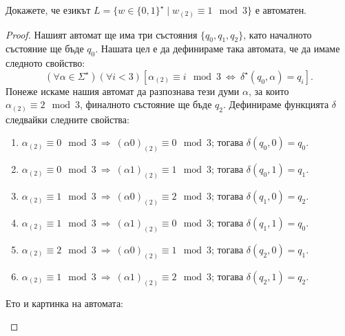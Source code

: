 \begin{prb}
  Докажете, че езикът
  $L = \{w \in \{0,1\}^\star \mid w_{(2)} \equiv 1 \mod 3\}$
  е автоматен.
\end{prb}
\begin{proof}
  Нашият автомат ще има три състояния $\{q_0,q_1,q_2\}$, като началното състояние ще бъде $q_0$.
  Нашата цел е да дефинираме така автомата, че да имаме следното свойство:
  \[(\forall\alpha\in\Sigma^\star)(\forall i < 3)[\alpha_{(2)} \equiv i\mod 3\ \Leftrightarrow\ \delta^\star(q_0,\alpha) = q_i].\]
  Понеже искаме нашия автомат да разпознава тези думи $\alpha$,
  за които $\alpha_{(2)} \equiv 2\mod 3$, финалното състояние ще бъде $q_2$.
  Дефинираме функцията $\delta$ следвайки следните свойства:
  \begin{enumerate}[(1)]
  \item
    $\alpha_{(2)} \equiv 0 \mod 3\ \Rightarrow\ (\alpha0)_{(2)} \equiv 0 \mod 3$; тогава $\delta(q_0,0) = q_0$.
  \item 
    $\alpha_{(2)} \equiv 0 \mod 3\ \Rightarrow\ (\alpha1)_{(2)} \equiv 1 \mod 3$; тогава $\delta(q_0,1) = q_1$.
  \item
    $\alpha_{(2)} \equiv 1 \mod 3\ \Rightarrow\ (\alpha0)_{(2)} \equiv 2 \mod 3$; тогава $\delta(q_1,0) = q_2$.
  \item 
    $\alpha_{(2)} \equiv 1 \mod 3\ \Rightarrow\ (\alpha1)_{(2)} \equiv 0 \mod 3$; тогава $\delta(q_1,1) = q_0$.
  \item
    $\alpha_{(2)} \equiv 2 \mod 3\ \Rightarrow\ (\alpha0)_{(2)} \equiv 1 \mod 3$; тогава $\delta(q_2,0) = q_1$.
  \item 
    $\alpha_{(2)} \equiv 1 \mod 3\ \Rightarrow\ (\alpha1)_{(2)} \equiv 2 \mod 3$; тогава $\delta(q_2,1) = q_2$.
  \end{enumerate}
  
  Ето и картинка на автомата:
  \begin{figure}[h!]
    \begin{subfigure}[b]{0.3\textwidth}%
    \end{subfigure}
 \end{figure}



\end{proof}
